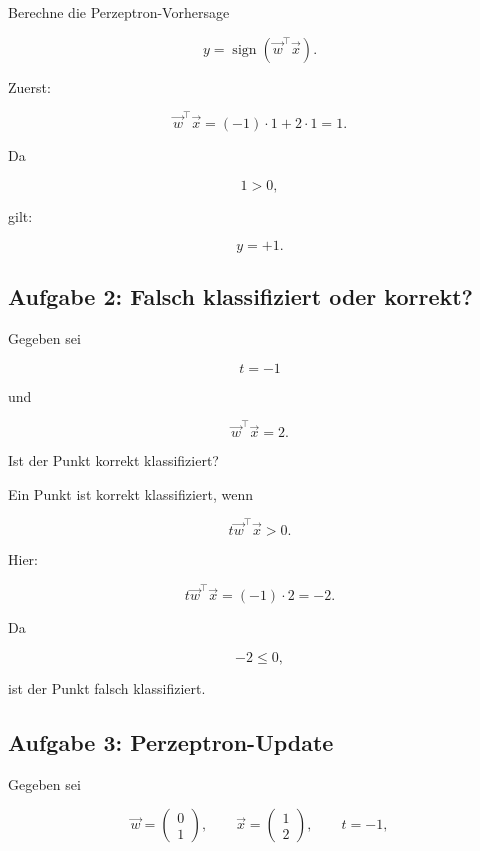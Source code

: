 Berechne die Perzeptron-Vorhersage

\[
    y
    =
    \operatorname{sign}(\vec{w}^{\top}\vec{x}).
\]

\begin{examplebox}
Zuerst:

\[
    \vec{w}^{\top}\vec{x}
    =
    (-1)\cdot 1 + 2\cdot 1
    =
    1.
\]

Da

\[
    1>0,
\]

gilt:

\[
    y=+1.
\]
\end{examplebox}

\subsection{Aufgabe 2: Falsch klassifiziert oder korrekt?}

Gegeben sei

\[
    t=-1
\]

und

\[
    \vec{w}^{\top}\vec{x}=2.
\]

Ist der Punkt korrekt klassifiziert?

\begin{examplebox}
Ein Punkt ist korrekt klassifiziert, wenn

\[
    t\vec{w}^{\top}\vec{x}>0.
\]

Hier:

\[
    t\vec{w}^{\top}\vec{x}
    =
    (-1)\cdot 2
    =
    -2.
\]

Da

\[
    -2 \leq 0,
\]

ist der Punkt falsch klassifiziert.
\end{examplebox}

\subsection{Aufgabe 3: Perzeptron-Update}

Gegeben sei

\[
    \vec{w}
    =
    \begin{pmatrix}
        0 \\
        1
    \end{pmatrix},
    \qquad
    \vec{x}
    =
    \begin{pmatrix}
        1 \\
        2
    \end{pmatrix},
    \qquad
    t=-1,
\]

